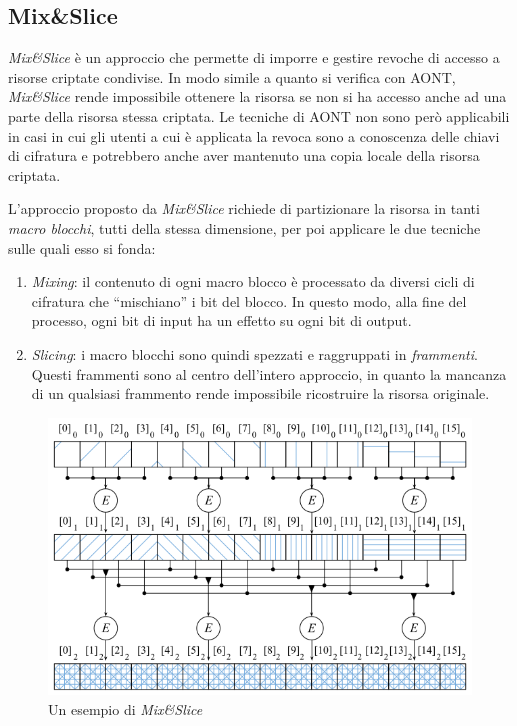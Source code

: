 \documentclass[a4paper,12pt,twoside,openright]{report}
\begin{document}
  \subsection{Mix\&Slice}

  \textit{Mix\&Slice} \cite{mixslice} è un approccio che permette di imporre e gestire revoche di accesso a risorse criptate condivise.
  In modo simile a quanto si verifica con AONT, \textit{Mix\&Slice} rende impossibile ottenere
  la risorsa se non si ha accesso anche ad una parte della risorsa stessa criptata.
  Le tecniche di AONT non sono però applicabili in casi in cui gli utenti a cui è applicata la revoca
  sono a conoscenza delle chiavi di cifratura e potrebbero anche aver mantenuto una copia locale della risorsa criptata.

  L'approccio proposto da \textit{Mix\&Slice} richiede di partizionare la risorsa in tanti \textit{macro blocchi}, tutti della stessa dimensione,
  per poi applicare le due tecniche sulle quali esso si fonda:

  \begin{enumerate}
    \item \textit{Mixing}: il contenuto di ogni macro blocco è processato da diversi cicli di cifratura che ``mischiano''
          i bit del blocco. In questo modo, alla fine del processo, ogni bit di input ha un effetto su ogni bit di output.
    \item \textit{Slicing}: i macro blocchi sono quindi spezzati e raggruppati in \textit{frammenti}. Questi frammenti sono al
          centro dell'intero approccio, in quanto la mancanza di un qualsiasi frammento rende impossibile ricostruire la risorsa originale.
  \end{enumerate}

  \begin{figure}[h!]
    \centering
    \includegraphics[width=0.7\linewidth]{images/mix_slice_example.png}
    \caption{Un esempio di \textit{Mix\&Slice}}
  \end{figure}
\end{document}
